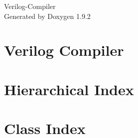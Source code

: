 \documentclass[twoside]{book}
\newcommand{\+}{\discretionary{\mbox{\scriptsize$\hookleftarrow$}}{}{}}
\newcommand{\clearemptydoublepage}{%
    \newpage{\pagestyle{empty}\cleardoublepage}%
  }
\begin{document}
  \raggedbottom
    \hypersetup{pageanchor=false,
                bookmarksnumbered=true,
                pdfencoding=unicode
               }
  \begin{titlepage}
  \vspace*{7cm}
  \begin{center}%
  {\Large Verilog-\/\+Compiler}\\
  \vspace*{1cm}
  {\large Generated by Doxygen 1.9.2}\\
  \end{center}
  \end{titlepage}
  \clearemptydoublepage
  \tableofcontents
  \clearemptydoublepage
  \hypersetup{pageanchor=true}
\chapter{Verilog Compiler}
\label{md_README}

\chapter{Hierarchical Index}

\chapter{Class Index}

\end{document}
